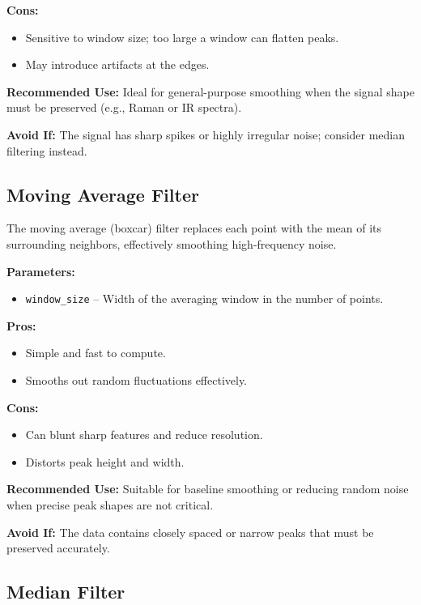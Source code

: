 \textbf{Cons:}
\begin{itemize}
    \item Sensitive to window size; too large a window can flatten peaks.
    \item May introduce artifacts at the edges.
\end{itemize}

\textbf{Recommended Use:}  
Ideal for general-purpose smoothing when the signal shape must be preserved (e.g., Raman or IR spectra).

\textbf{Avoid If:}  
The signal has sharp spikes or highly irregular noise; consider median filtering instead.

\subsection{Moving Average Filter}

The moving average (boxcar) filter replaces each point with the mean of its surrounding neighbors, effectively smoothing high-frequency noise.

\textbf{Parameters:}
\begin{itemize}
    \item \texttt{window\_size} – Width of the averaging window in the number of points.
\end{itemize}

\textbf{Pros:}
\begin{itemize}
    \item Simple and fast to compute.
    \item Smooths out random fluctuations effectively.
\end{itemize}

\textbf{Cons:}
\begin{itemize}
    \item Can blunt sharp features and reduce resolution.
    \item Distorts peak height and width.
\end{itemize}

\textbf{Recommended Use:}  
Suitable for baseline smoothing or reducing random noise when precise peak shapes are not critical.

\textbf{Avoid If:}  
The data contains closely spaced or narrow peaks that must be preserved accurately.

\subsection{Median Filter}

